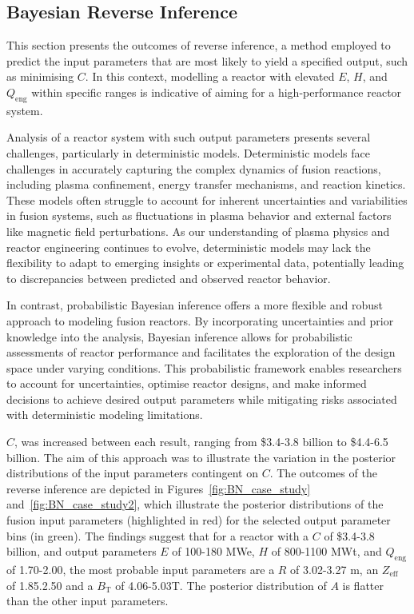 \documentclass[journal]{IEEEtran}
\begin{document}
\subsection{Bayesian Reverse Inference}\label{sec:res_reverse}

This section presents the outcomes of reverse inference, a method employed to predict the input parameters that are most likely to yield a specified output, such as minimising $C$. In this context, modelling a reactor with elevated $E$, $H$, and $Q_{\text{eng}}$ within specific ranges is indicative of aiming for a high-performance reactor system. 

Analysis of a reactor system with such output parameters presents several challenges, particularly in deterministic models. Deterministic models face challenges in accurately capturing the complex dynamics of fusion reactions, including plasma confinement, energy transfer mechanisms, and reaction kinetics. These models often struggle to account for inherent uncertainties and variabilities in fusion systems, such as fluctuations in plasma behavior and external factors like magnetic field perturbations. As our understanding of plasma physics and reactor engineering continues to evolve, deterministic models may lack the flexibility to adapt to emerging insights or experimental data, potentially leading to discrepancies between predicted and observed reactor behavior.

In contrast, probabilistic Bayesian inference offers a more flexible and robust approach to modeling fusion reactors. By incorporating uncertainties and prior knowledge into the analysis, Bayesian inference allows for probabilistic assessments of reactor performance and facilitates the exploration of the design space under varying conditions. This probabilistic framework enables researchers to account for uncertainties, optimise reactor designs, and make informed decisions to achieve desired output parameters while mitigating risks associated with deterministic modeling limitations.

$C$, was increased between each result, ranging from \$3.4-3.8 billion to \$4.4-6.5 billion. The aim of this approach was to illustrate the variation in the posterior distributions of the input parameters contingent on $C$. The outcomes of the reverse inference are depicted in Figures~\ref{fig:BN_case_study} and~\ref{fig:BN_case_study2}, which illustrate the posterior distributions of the fusion input parameters (highlighted in red) for the selected output parameter bins (in green). The findings suggest that for a reactor with a $C$ of \$3.4-3.8 billion, and output parameters $E$ of 100-180 MWe, $H$ of 800-1100 MWt, and $Q_{\text{eng}}$ of 1.70-2.00, the most probable input parameters are a $R$ of 3.02-3.27 m, an $Z_{\text{eff}}$ of 1.85.2.50 and a $B_{\text{T}}$ of 4.06-5.03T. The posterior distribution of $A$ is flatter than the other input parameters.  
\end{document}
